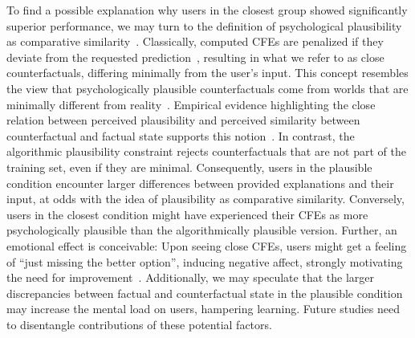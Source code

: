 To find a possible explanation why users in the closest group showed significantly superior performance, we may turn to the definition of psychological plausibility as comparative similarity~\citep{lewis_counterfactuals_1973, stanley_counterfactual_2017}. 
Classically, computed CFEs are penalized if they deviate from the requested prediction~\citep{wachter_counterfactual_2017}, resulting in what we refer to as close counterfactuals, differing minimally from the user’s input.
This concept resembles the view that psychologically plausible counterfactuals come from worlds that are minimally different from reality~\citep{lewis_counterfactuals_1973}.
Empirical evidence highlighting the close relation between perceived plausibility and perceived similarity between counterfactual and factual state supports this notion~\citep{stanley_counterfactual_2017, de_brigard_perceived_2021}.
In contrast, the algorithmic plausibility constraint rejects counterfactuals that are not part of the training set, even if they are minimal.
Consequently, users in the plausible condition encounter larger differences between provided explanations and their input, at odds with the idea of plausibility as comparative similarity.
Conversely, users in the closest condition might have experienced their \glspl{CFE} as more psychologically plausible than the algorithmically plausible version.
Further, an emotional effect is conceivable: Upon seeing close \glspl{CFE}, users might get a feeling of ``just missing the better option'', inducing negative affect, strongly motivating the need for improvement~\citep{medvec_when_1997, markman_reflection_2003}.
Additionally, we may speculate that the larger discrepancies between factual and counterfactual state in the plausible condition may increase the mental load on users, hampering learning.
Future studies need to disentangle contributions of these potential factors.


